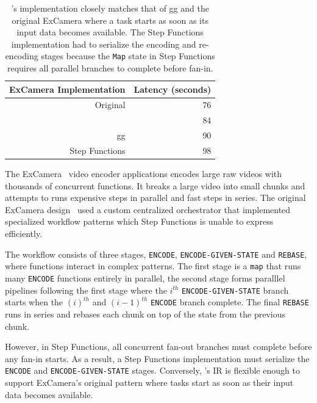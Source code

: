 \begin{table}[]
  \centering
  \begin{tabular}{|r|r|}
    \hline
    \textbf{ExCamera Implementation} & \textbf{Latency (seconds)} \\ \hline
    Original        & 76                         \\ \hline
    \name{} & 84                         \\ \hline
    gg                       & 90                         \\ \hline
    Step Functions & 98                         \\ \hline
  \end{tabular}
  \caption{\name{}'s implementation closely matches that of gg and the original
    ExCamera where a task starts as soon as its input data becomes available. The
    Step Functions implementation had to serialize the encoding and re-encoding
    stages because the \texttt{Map} state in Step Functions requires all parallel
    branches to complete before fan-in.}
  \label{table:excamera}
\end{table}

The ExCamera~\cite{excamera} video encoder applications encodes large raw videos
with thousands of concurrent functions. It breaks a large video into small
chunks and attempts to runs expensive steps in parallel and fast steps in
series. The original ExCamera design~\cite{excamera} used a custom centralized
orchestrator that implemented specialized workflow patterns which Step Functions
is unable to express efficiently.

The workflow consists of three stages, \texttt{ENCODE},
\texttt{ENCODE-GIVEN-STATE} and \texttt{REBASE}, where functions interact in
complex patterns. The first stage is a \texttt{map} that runs many
\texttt{ENCODE} functions entirely in parallel, the second stage forms paralllel
pipelines following the first stage where the $i^{th}$
\texttt{ENCODE-GIVEN-STATE} branch starts when the $(i)^{th}$ and $(i-1)^{th}$
\texttt{ENCODE} branch complete. The final \texttt{REBASE} runs in series and
rebases each chunk on top of the state from the previous chunk.

However, in Step Functions, all concurrent fan-out branches must complete before
any fan-in starts. As a result, a Step Functions implementation must serialize
the \texttt{ENCODE} and \texttt{ENCODE-GIVEN-STATE} stages.  Conversely,
\name{}'s IR is flexible enough to support ExCamera's original pattern where
tasks start as soon as their input data becomes available.

